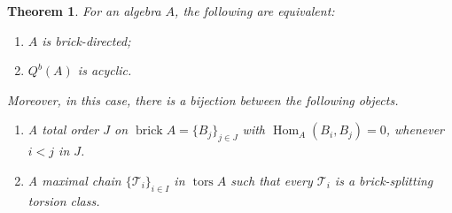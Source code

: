 \documentclass{amsart}
\theoremstyle{thmstyle}
\newtheorem{theorem}[thm]{Theorem}
\theoremstyle{exstyle}
\theoremstyle{defstyle}
\theoremstyle{remstyle}
\theoremstyle{remstyle}
\newcommand{\Hom}{\operatorname{Hom}}
\DeclareMathOperator*{\brick}{brick}
\DeclareMathOperator*{\tors}{tors}
\begin{document}
\begin{theorem}\label{Thm: Brick-directed & maximal chain of brick-splitting pairs}
For an algebra $A$, the following are equivalent:
\begin{enumerate}
    \item[$(i)$] $A$ is brick-directed;
    \item[$(ii)$] $Q^b(A)$ is acyclic.
\end{enumerate}
Moreover, in this case, there is a bijection between the following objects.
\begin{enumerate}
    \item A total order $J$ on $\brick A = \{B_j\}_{j \in J}$ with $\Hom_A(B_{i}, B_j)=0$, whenever $i < j$ in $J$.
    \item A maximal chain $\{\mathcal{T}_i\}_{i\in I}$ in $\tors A$ such that every $\mathcal{T}_i$ is a brick-splitting torsion class.
\end{enumerate}
\end{theorem}
\end{document}
